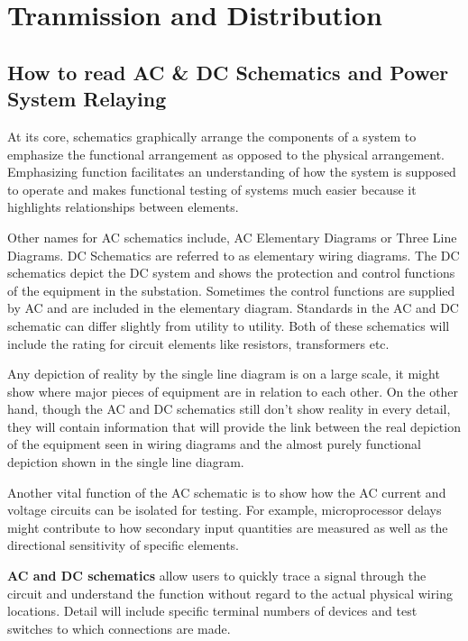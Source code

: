 \chapter{Tranmission and Distribution}

\section{How to read AC \& DC Schematics and Power System Relaying}
\begin{concept}
    At its core, schematics graphically arrange the components of a system to emphasize the functional arrangement as opposed to the physical arrangement. Emphasizing function facilitates an understanding of how the system is supposed to operate and makes functional testing of systems much easier because it highlights relationships between elements.
\end{concept}

Other names for AC schematics include, AC Elementary Diagrams or Three Line Diagrams. DC Schematics are referred to as elementary wiring diagrams. The DC schematics depict the DC system and shows the protection and control functions of the equipment in the substation. Sometimes the control functions are supplied by AC and are included in the elementary diagram. Standards in the AC and DC schematic can differ slightly from utility to utility. Both of these schematics will include the rating for circuit elements like resistors, transformers etc.

Any depiction of reality by the single line diagram is on a large scale, it might show where major pieces of equipment are in relation to each other. On the other hand, though the AC and DC schematics still don’t show reality in every detail, they will contain information that will provide the link between the real depiction of the equipment seen in wiring diagrams and the almost purely functional depiction shown in the single line diagram.

Another vital function of the AC schematic is to show how the AC current and voltage circuits can be isolated for testing. For example, microprocessor delays might contribute to how secondary input quantities are measured as well as the directional sensitivity of specific elements.

\begin{concept}
    \textbf{AC and DC schematics} allow users to quickly trace a signal through the circuit and understand the function without regard to the actual physical wiring locations. Detail will include specific terminal numbers of devices and test switches to which connections are made. 
\end{concept}


